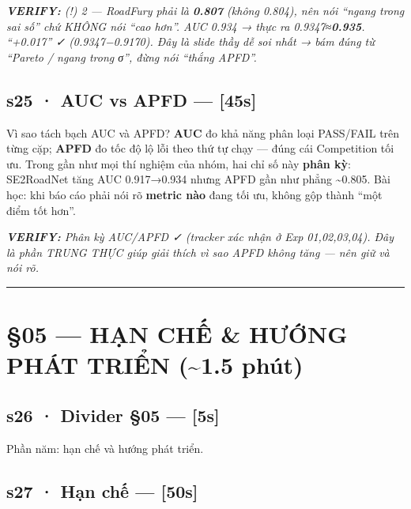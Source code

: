 \documentclass[
  11pt,
]{article}
\renewenvironment{quote}
  {\par\smallskip\noindent
   \def\FrameCommand{{\color{deckorange}\vrule width 2.5pt}\hspace{10pt}}%
   \MakeFramed{\advance\hsize-\width\FrameRestore}%
   \footnotesize\itshape\color{deckslate}}
  {\par\endMakeFramed\smallskip}
\begin{document}
\begin{quote}
\textbf{VERIFY:} (!) 2 --- RoadFury phải là \textbf{0.807} (không
0.804), nên nói ``ngang trong sai số'' chứ KHÔNG nói ``cao hơn''. AUC
0.934 → thực ra 0.9347≈\textbf{0.935}. ``+0.017'' ✓ (0.9347−0.9170). Đây
là slide thầy dễ soi nhất → bám đúng từ ``Pareto / ngang trong σ'', đừng
nói ``thắng APFD''.
\end{quote}

\subsection{s25 · AUC vs APFD --- {[}45s{]}}\label{s25-auc-vs-apfd-45s}

Vì sao tách bạch AUC và APFD? \textbf{AUC} đo khả năng phân loại
PASS/FAIL trên từng cặp; \textbf{APFD} đo tốc độ lộ lỗi theo thứ tự chạy
--- đúng cái Competition tối ưu. Trong gần như mọi thí nghiệm của nhóm,
hai chỉ số này \textbf{phân kỳ}: SE2RoadNet tăng AUC 0.917→0.934 nhưng
APFD gần như phẳng \textasciitilde0.805. Bài học: khi báo cáo phải nói
rõ \textbf{metric nào} đang tối ưu, không gộp thành ``một điểm tốt
hơn''.

\begin{quote}
\textbf{VERIFY:} Phân kỳ AUC/APFD ✓ (tracker xác nhận ở Exp
01,02,03,04). Đây là phần TRUNG THỰC giúp giải thích vì sao APFD không
tăng --- nên giữ và nói rõ.
\end{quote}

\begin{center}\rule{0.5\linewidth}{0.5pt}\end{center}

\section{§05 --- HẠN CHẾ \& HƯỚNG PHÁT TRIỂN (\textasciitilde1.5
phút)}\label{hux1ea1n-chux1ebf-hux1b0ux1edbng-phuxe1t-triux1ec3n-1.5-phuxfat}

\subsection{s26 · Divider §05 --- {[}5s{]}}\label{s26-divider-05-5s}

Phần năm: hạn chế và hướng phát triển.

\subsection{s27 · Hạn chế ---
{[}50s{]}}\label{s27-hux1ea1n-chux1ebf-50s}
\end{document}
